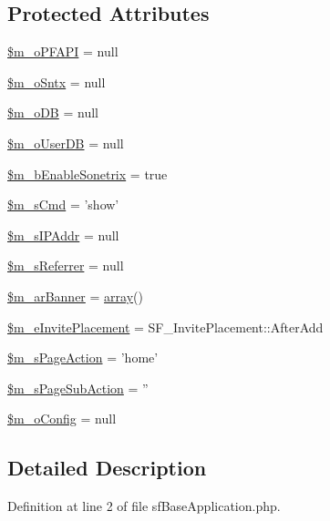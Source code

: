 \subsection*{Protected Attributes}
\begin{DoxyCompactItemize}
\item 
\hyperlink{classSFApplication_a23d5b5190ee32c4eb8fff028844b1fa6}{\$m\_\-oPFAPI} = null
\item 
\hyperlink{classSFApplication_a22d1091f94c58e3533304abe3eb9e9fe}{\$m\_\-oSntx} = null
\item 
\hyperlink{classSFApplication_af0fd242fc474881efab473522eec0748}{\$m\_\-oDB} = null
\item 
\hyperlink{classSFApplication_a480a834e33015cc9a001d1d84972bb12}{\$m\_\-oUserDB} = null
\item 
\hyperlink{classSFApplication_a55534a049a693ced372dba4331e5e9bd}{\$m\_\-bEnableSonetrix} = true
\item 
\hyperlink{classSFApplication_a21ffd6ebc459ccba9514cbaee05b2ece}{\$m\_\-sCmd} = 'show'
\item 
\hyperlink{classSFApplication_a2db945fecc9d0f95e19093d7829be78d}{\$m\_\-sIPAddr} = null
\item 
\hyperlink{classSFApplication_a251ed856d45aa28d717a012291b71d26}{\$m\_\-sReferrer} = null
\item 
\hyperlink{classSFApplication_a03606a66e78d358c6094f05f0857845d}{\$m\_\-arBanner} = \hyperlink{list_8php_aa3205d038c7f8feb5c9f01ac4dfadc88}{array}()
\item 
\hyperlink{classSFApplication_a78a5b97e38e7a2bc9e36cca0a97a2cca}{\$m\_\-eInvitePlacement} = SF\_\-InvitePlacement::AfterAdd
\item 
\hyperlink{classSFApplication_a82cc1f3844569fa451cac5abc03b1a4d}{\$m\_\-sPageAction} = 'home'
\item 
\hyperlink{classSFApplication_a980e6fd9e83172281b1e6dac50f16e9c}{\$m\_\-sPageSubAction} = ''
\item 
\hyperlink{classSFApplication_a0af2b37a09c1015be10cfa60f3f1d1b9}{\$m\_\-oConfig} = null
\end{DoxyCompactItemize}


\subsection{Detailed Description}


Definition at line 2 of file sfBaseApplication.php.



